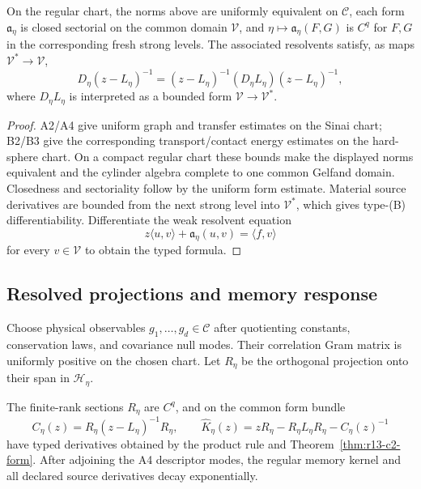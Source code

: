 \begin{theorem}
\label{thm:r13-c2-form}
On the regular chart, the norms above are uniformly equivalent on
$\mathcal C$, each form $\mathfrak a_\eta$ is closed sectorial on the common
domain $\mathcal V$, and
$\eta\mapsto\mathfrak a_\eta(F,G)$ is $C^q$ for
$F,G$ in the corresponding fresh strong levels.  The associated resolvents
satisfy, as maps $\mathcal V^*\to\mathcal V$,
\[
 D_\eta(z-L_\eta)^{-1}
 =(z-L_\eta)^{-1}(D_\eta L_\eta)(z-L_\eta)^{-1},
\]
where $D_\eta L_\eta$ is interpreted as a bounded form
$\mathcal V\to\mathcal V^*$.
\end{theorem}

\begin{proof}
A2/A4 give uniform graph and transfer estimates on the Sinai chart; B2/B3
give the corresponding transport/contact energy estimates on the hard-sphere
chart.  On a compact regular chart these bounds make the displayed norms
equivalent and the cylinder algebra complete to one common Gelfand domain.
Closedness and sectoriality follow by the uniform form estimate.  Material
source derivatives are bounded from the next strong level into
$\mathcal V^*$, which gives type-(B) differentiability.  Differentiate the
weak resolvent equation
\[
 z\langle u,v\rangle+\mathfrak a_\eta(u,v)=\langle f,v\rangle
\]
for every $v\in\mathcal V$ to obtain the typed formula.
\end{proof}

\subsection{Resolved projections and memory response}

Choose physical observables $g_1,\ldots,g_d\in\mathcal C$ after quotienting
constants, conservation laws, and covariance null modes.  Their correlation
Gram matrix is uniformly positive on the chosen chart.  Let $R_\eta$ be the
orthogonal projection onto their span in $\mathcal H_\eta$.

\begin{theorem}
\label{thm:r13-c2-memory}
The finite-rank sections $R_\eta$ are $C^q$, and on the common form bundle
\[
 C_\eta(z)=R_\eta(z-L_\eta)^{-1}R_\eta,
 \qquad
 \widehat K_\eta(z)=zR_\eta-R_\eta L_\eta R_\eta-C_\eta(z)^{-1}
\]
have typed derivatives obtained by the product rule and
Theorem~\ref{thm:r13-c2-form}.  After adjoining the A4 descriptor modes, the
regular memory kernel and all declared source derivatives decay
exponentially.
\end{theorem}

